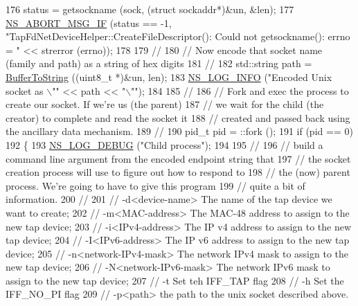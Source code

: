 \begin{DoxyCode}
176   status = getsockname (sock, (\textcolor{keyword}{struct} sockaddr*)&un, &len);
177   \hyperlink{group__fatal_ga6653324225bc139e46deea177614ceee}{NS\_ABORT\_MSG\_IF} (status == -1, \textcolor{stringliteral}{"TapFdNetDeviceHelper::CreateFileDescriptor(): Could not
       getsockname(): errno = "} << strerror (errno));
178 
179   \textcolor{comment}{//}
180   \textcolor{comment}{// Now encode that socket name (family and path) as a string of hex digits}
181   \textcolor{comment}{//}
182   std::string path = \hyperlink{namespacens3_a97907497171f00140c77ed054e3baad6}{BufferToString} ((uint8\_t *)&un, len);
183   \hyperlink{group__logging_gafbd73ee2cf9f26b319f49086d8e860fb}{NS\_LOG\_INFO} (\textcolor{stringliteral}{"Encoded Unix socket as \(\backslash\)""} << path << \textcolor{stringliteral}{"\(\backslash\)""});
184 
185   \textcolor{comment}{//}
186   \textcolor{comment}{// Fork and exec the process to create our socket.  If we're us (the parent)}
187   \textcolor{comment}{// we wait for the child (the creator) to complete and read the socket it}
188   \textcolor{comment}{// created and passed back using the ancillary data mechanism.}
189   \textcolor{comment}{//}
190   pid\_t pid = ::fork ();
191   \textcolor{keywordflow}{if} (pid == 0)
192     \{
193       \hyperlink{group__logging_ga413f1886406d49f59a6a0a89b77b4d0a}{NS\_LOG\_DEBUG} (\textcolor{stringliteral}{"Child process"});
194 
195       \textcolor{comment}{//}
196       \textcolor{comment}{// build a command line argument from the encoded endpoint string that}
197       \textcolor{comment}{// the socket creation process will use to figure out how to respond to}
198       \textcolor{comment}{// the (now) parent process.  We're going to have to give this program}
199       \textcolor{comment}{// quite a bit of information.}
200       \textcolor{comment}{//}
201       \textcolor{comment}{// -d<device-name> The name of the tap device we want to create;}
202       \textcolor{comment}{// -m<MAC-address> The MAC-48 address to assign to the new tap device;}
203       \textcolor{comment}{// -i<IPv4-address> The IP v4 address to assign to the new tap device;}
204       \textcolor{comment}{// -I<IPv6-address> The IP v6 address to assign to the new tap device;}
205       \textcolor{comment}{// -n<network-IPv4-mask> The network IPv4 mask to assign to the new tap device;}
206       \textcolor{comment}{// -N<network-IPv6-mask> The network IPv6 mask to assign to the new tap device;}
207       \textcolor{comment}{// -t Set teh IFF\_TAP flag}
208       \textcolor{comment}{// -h Set the IFF\_NO\_PI flag}
209       \textcolor{comment}{// -p<path> the path to the unix socket described above.}

\end{DoxyCode}
